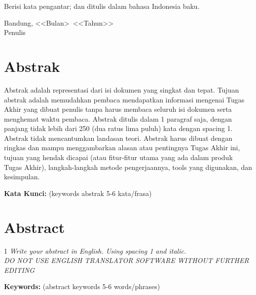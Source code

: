 \documentclass[a4paper,11pt,oneside]{report}
\begin{document}
Berisi kata pengantar; dan ditulis dalam bahasa Indonesia baku.

\vspace{3cm}
\begin{flushright}
    Bandung, \textless\textless Bulan\textgreater\ \textless\textless Tahun\textgreater\textgreater\\[6pt]
    Penulis
\end{flushright}

\chapter*{Abstrak}

Abstrak adalah representasi dari isi dokumen yang singkat dan tepat. Tujuan
abstrak adalah memudahkan pembaca mendapatkan informasi mengenai Tugas Akhir
yang dibuat penulis tanpa harus membaca seluruh isi dokumen serta menghemat
waktu pembaca. Abstrak ditulis dalam 1 paragraf saja, dengan panjang tidak
lebih dari 250 (dua ratus lima puluh) kata dengan spacing 1. Abstrak tidak
mencantumkan landasan teori. Abstrak harus dibuat dengan ringkas dan mampu
menggambarkan alasan atau pentingnya Tugas Akhir ini, tujuan yang hendak
dicapai (atau fitur-fitur utama yang ada dalam produk Tugas Akhir),
langkah-langkah metode pengerjaannya, tools yang digunakan, dan kesimpulan.

\vspace{1cm}
\noindent\textbf{Kata Kunci:} (keywords abstrak 5-6 kata/frasa)

\chapter*{Abstract}

\begin{spacing}{1}
\textit{Write your abstract in English. Using spacing 1 and italic.\\
DO NOT USE ENGLISH TRANSLATOR SOFTWARE WITHOUT FURTHER EDITING}

\vspace{1cm}
\noindent\textbf{Keywords:} (abstract keywords 5-6 words/phrases)
\end{spacing}
\end{document}
